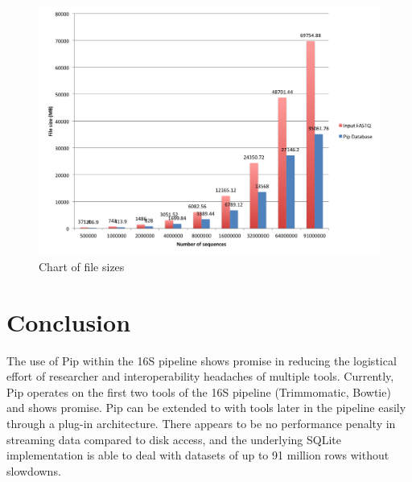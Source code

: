 \documentclass[12pt]{article}
\begin{document}
\begin{figure}[h!]
	\centering
	\includegraphics[width=\textwidth]{filesizes_chart}
	\caption{Chart of file sizes}
	\label{fig:filesizes}
\end{figure}



\section{Conclusion} %
\label{sec:conclusion}
The use of Pip within the 16S pipeline shows promise in reducing the logistical
effort of researcher and interoperability headaches of multiple tools. Currently,
Pip operates on the first two tools of the 16S pipeline (Trimmomatic, Bowtie) and
shows promise. Pip can be extended to with tools later in the pipeline easily through
a plug-in architecture. There appears to be no performance penalty in streaming
data compared to disk access, and the underlying SQLite implementation is able to
deal with datasets of up to 91 million rows without slowdowns.
\end{document}
